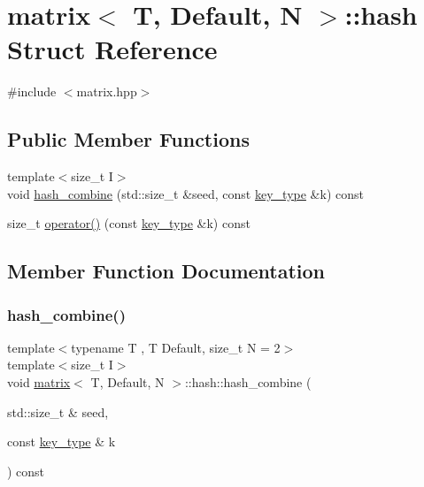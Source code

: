 \hypertarget{structmatrix_1_1hash}{}\section{matrix$<$ T, Default, N $>$\+:\+:hash Struct Reference}
\label{structmatrix_1_1hash}


{\ttfamily \#include $<$matrix.\+hpp$>$}

\subsection*{Public Member Functions}
\begin{DoxyCompactItemize}
\item 
{\footnotesize template$<$size\+\_\+t I$>$ }\\void \hyperlink{structmatrix_1_1hash_ab37cb6f216dec2a02dbd91f18a008cec}{hash\+\_\+combine} (std\+::size\+\_\+t \&seed, const \hyperlink{structmatrix_ae7906bda02f5d7f6744d9545c9465e13}{key\+\_\+type} \&k) const
\item 
size\+\_\+t \hyperlink{structmatrix_1_1hash_a39d8ff8cf4dcd1ae2cda997d93ebe6ec}{operator()} (const \hyperlink{structmatrix_ae7906bda02f5d7f6744d9545c9465e13}{key\+\_\+type} \&k) const
\end{DoxyCompactItemize}


\subsection{Member Function Documentation}
\mbox{\label{structmatrix_1_1hash_ab37cb6f216dec2a02dbd91f18a008cec}} 
\subsubsection{\texorpdfstring{hash\+\_\+combine()}{hash\_combine()}}
{\footnotesize\ttfamily template$<$typename T , T Default, size\+\_\+t N = 2$>$ \\
template$<$size\+\_\+t I$>$ \\
void \hyperlink{structmatrix}{matrix}$<$ T, Default, N $>$\+::hash\+::hash\+\_\+combine (\begin{DoxyParamCaption}\item[{std\+::size\+\_\+t \&}]{seed,  }\item[{const \hyperlink{structmatrix_ae7906bda02f5d7f6744d9545c9465e13}{key\+\_\+type} \&}]{k }\end{DoxyParamCaption}) const\hspace{0.3cm}{\ttfamily [inline]}}


